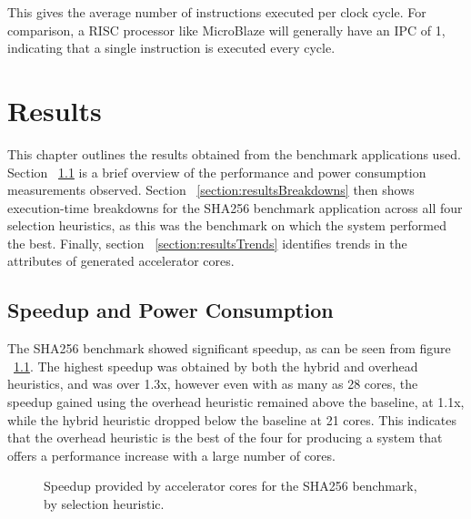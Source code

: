 \documentclass{UoYCSproject}
\begin{document}
This gives the average number of instructions executed per clock cycle. For comparison, a RISC processor like MicroBlaze
will generally have an IPC of 1, indicating that a single instruction is executed every cycle.

\chapter{Results}

This chapter outlines the results obtained from the benchmark applications used. Section ~\ref{section:resultsOverview} is a
brief overview of the performance and power consumption measurements observed. Section ~\ref{section:resultsBreakdowns} then
shows execution-time breakdowns for the SHA256 benchmark application across all four selection heuristics,
as this was the benchmark on which the system performed the best.
Finally, section ~\ref{section:resultsTrends} identifies trends in the attributes of generated accelerator cores.

\section{Speedup and Power Consumption}
\label{section:resultsOverview}

The SHA256 benchmark showed significant speedup, as can be seen from figure ~\ref{fig:speedupSHA256}. The highest speedup was
obtained by both the hybrid and overhead heuristics, and was over 1.3x, however even with as many as 28 cores, the speedup
gained using the overhead heuristic remained above the baseline, at 1.1x, while the hybrid heuristic dropped below the baseline
at 21 cores. This indicates that the overhead heuristic is the best of the four for producing a system that offers a performance
increase with a large number of cores.

\begin{figure}[H]
\caption{Speedup provided by accelerator cores for the SHA256 benchmark, by selection heuristic.}
\label{fig:speedupSHA256}
\end{figure}
\end{document}
